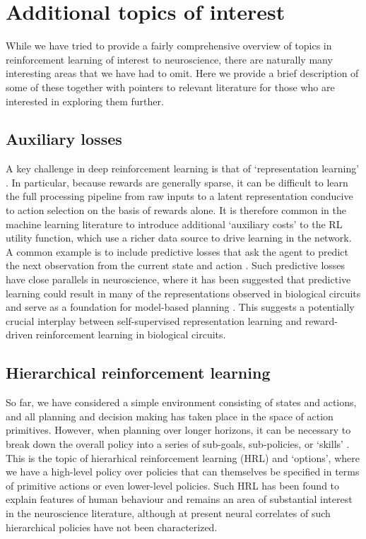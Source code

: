 \section{Additional topics of interest}
\label{sec:additional}

While we have tried to provide a fairly comprehensive overview of topics in reinforcement learning of interest to neuroscience, there are naturally many interesting areas that we have had to omit.
Here we provide a brief description of some of these together with pointers to relevant literature for those who are interested in exploring them further.

\subsection{Auxiliary losses}
\label{sec:auxiliary}
A key challenge in deep reinforcement learning is that of `representation learning' \citep{botvinick2020deep}.
In particular, because rewards are generally sparse, it can be difficult to learn the full processing pipeline from raw inputs to a latent representation conducive to action selection on the basis of rewards alone.
It is therefore common in the machine learning literature to introduce additional `auxiliary costs' to the RL utility function, which use a richer data source to drive learning in the network.
A common example is to include predictive losses that ask the agent to predict the next observation from the current state and action \citep{jaderberg2016reinforcement, zintgraf2019varibad}.
Such predictive losses have close parallels in neuroscience, where it has been suggested that predictive learning could result in many of the representations observed in biological circuits \citep{rao1999predictive, stachenfeld2017hippocampus, whittington2020tolman, blanco2021dopamine} and serve as a foundation for model-based planning \citep{jensen2023recurrent}.
This suggests a potentially crucial interplay between self-supervised representation learning and reward-driven reinforcement learning in biological circuits.

\subsection{Hierarchical reinforcement learning}
\label{sec:HRL}
So far, we have considered a simple environment consisting of states and actions, and all planning and decision making has taken place in the space of action primitives.
However, when planning over longer horizons, it can be necessary to break down the overall policy into a series of sub-goals, sub-policies, or `skills' \citep{sutton1999between, pateria2021hierarchical}.
This is the topic of hierarhical reinforcement learning (HRL) and `options', where we have a high-level policy over policies that can themselves be specified in terms of primitive actions or even lower-level policies.
Such HRL has been found to explain features of human behaviour \citep{eckstein2020computational,botvinick2008hierarchical,botvinick2009hierarchically} and remains an area of substantial interest in the neuroscience literature, although at present neural correlates of such hierarchical policies have not been characterized.

